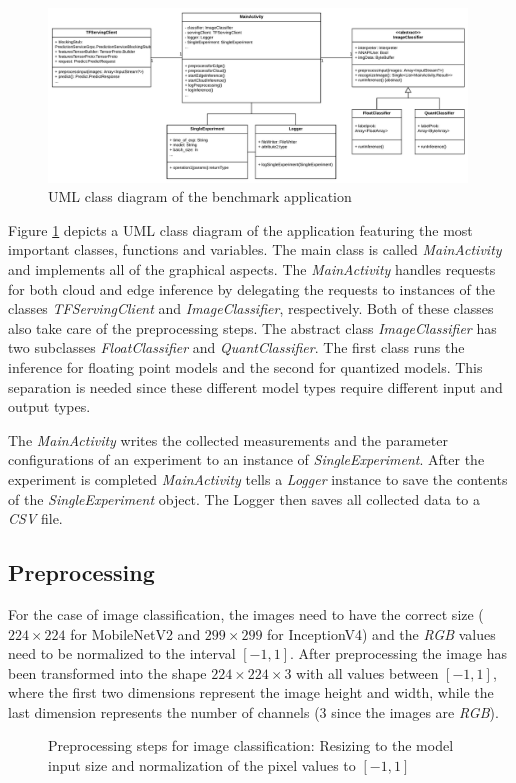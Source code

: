 \begin{figure}[htb]
\centering
\includegraphics[width=0.99\textwidth]{./Bilder/UML.pdf}
\caption{UML class diagram of the benchmark application}
\label{fig:UML}
\end{figure}
Figure \ref{fig:UML} depicts a UML class diagram of the application featuring the most important classes, functions and variables. 
The main class is called \emph{MainActivity} and implements all of the graphical aspects. 
The \emph{MainActivity} handles requests for both cloud and edge inference by delegating the requests to instances of the classes \emph{TFServingClient} and \emph{ImageClassifier}, respectively. Both of these classes also take care of the preprocessing steps.
The abstract class \emph{ImageClassifier} has two subclasses \emph{FloatClassifier} and \emph{QuantClassifier}. The first class runs the inference for floating point models and the second for quantized models.
This separation is needed since these different model types require different input and output types.

The \emph{MainActivity} writes the collected measurements and the parameter configurations of an experiment to an instance of \emph{SingleExperiment}. After the experiment is completed \emph{MainActivity} tells a \emph{Logger} instance to save the contents of the \emph{SingleExperiment} object. The Logger then saves all collected data to a \emph{CSV} file.

\subsection{Preprocessing}
For the case of image classification, the images need to have the correct size ($224\times224$ for MobileNetV2 and $299\times299$ for InceptionV4) and the \emph{RGB} values need to be normalized to the interval $[-1,1]$. After preprocessing the image has been transformed into the shape $224\times224\times3$ with all values between $[-1,1]$, where the first two dimensions represent the image height and width, while the last dimension represents the number of channels (3 since the images are \emph{RGB}).
\begin{figure}[H]
\centering

\caption{Preprocessing steps for image classification: Resizing to the model input size and normalization of the pixel values to $[-1,1]$}
\label{fig:prepro}
\end{figure}
